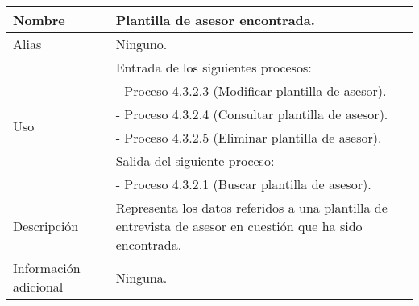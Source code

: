 \begin{center}
  \begin{tabular}{| l | p{9cm} |}
    \hline
    Nombre & \textbf{Plantilla de asesor encontrada}.\\
    \hline
    Alias & Ninguno.\\
    \hline
    \multirow{6}{*}{Uso} & Entrada de los siguientes procesos:\\
                         & - Proceso 4.3.2.3 (Modificar plantilla de asesor).\\
                         & - Proceso 4.3.2.4 (Consultar plantilla de asesor).\\
                         & - Proceso 4.3.2.5 (Eliminar plantilla de asesor).\\
                         & Salida del siguiente proceso:\\
                         & - Proceso 4.3.2.1 (Buscar plantilla de asesor).\\
    \hline
    Descripción & Representa los datos referidos a una plantilla de entrevista
                  de asesor en cuestión que ha sido encontrada.\\
    \hline
    Información adicional & Ninguna.\\
    \hline
  \end{tabular}
\end{center}
